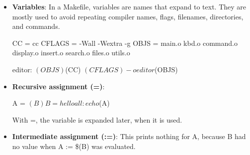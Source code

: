 \documentclass{report}
\begin{document}
    \pagebreak 
    \begin{itemize}
        \item \textbf{Variables}: In a Makefile, variables are names that expand to text. They are mostly used to avoid repeating compiler names, flags, filenames, directories, and commands.
            \bigbreak \noindent 
            \begin{cppcode}
                CC = cc
                CFLAGS = -Wall -Wextra -g
                OBJS = main.o kbd.o command.o display.o insert.o search.o files.o utils.o

                editor: $(OBJS)
                    $(CC) $(CFLAGS) -o editor $(OBJS)
            \end{cppcode}
        \item \textbf{Recursive assignment (=)}: 
            \bigbreak \noindent 
            \begin{bashcode}
                A = $(B)
                B = hello

                all:
                    echo $(A)
            \end{bashcode}
            \bigbreak \noindent 
            With =, the variable is expanded later, when it is used.
        \item \textbf{Intermediate assignment (:=)}: This prints nothing for A, because B had no value when A := \$(B) was evaluated.
            \bigbreak \noindent 
\end{itemize}
\end{document}
